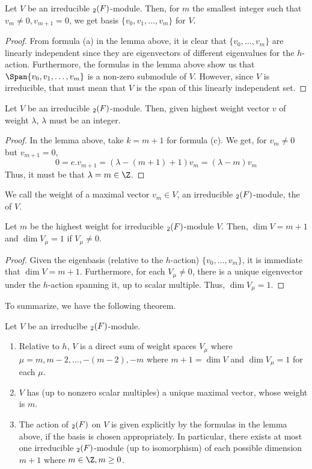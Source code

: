 \documentclass[11pt,leqno,oneside]{amsart}
\numberwithin{thm}{section}
\begin{document}
\begin{prop}
  Let \(V\) be an irreducible \(\sl_2(F)\)-module. Then, for \(m\) the
  smallest integer such that \(v_m \neq 0, v_{m+1} = 0\), we get basis
  \(\{v_0, v_1, \ldots, v_m\}\) for \(V\).
\end{prop}
\begin{proof}
  From formula (a) in the lemma above, it is clear that \(\{v_0,
  \ldots, v_m\}\) are linearly independent since they are eigenvectors
  of different eigenvalues for the \(h\)-action. Furthermore, the
  formulas in the lemma above show us that \(\Span \{v_0, v_1, \ldots,
  v_m\}\) is a non-zero submodule of \(V\). However, since \(V\) is
  irreducible, that must mean that \(V\) is the span of this linearly
  independent set. 
\end{proof}
\begin{prop}
  Let \(V\) be an irreducible \(\sl_2(F)\)-module. Then, given highest
  weight vector \(v\) of weight \(\lambda\), \(\lambda\) must be an
  integer. 
\end{prop}
\begin{proof}
  In the lemma above, take \(k = m+1\) for formula (c). We get, for
  \(v_m \neq 0\) but \(v_{m+1} = 0\), \[
    0 = e.v_{m+1} = (\lambda-(m+1)+1)v_m = (\lambda-m)v_m
  \]
  Thus, it must be that \(\lambda = m \in \Z\).
\end{proof}
\begin{defn}
  We call the weight of a maximal vector \(v_m \in V\), an irreducible
  \(\sl_2(F)\)-module, the  of \(V\).
\end{defn}
\begin{prop}\label{dim-of-hwt-mod}
  Let \(m\) be the highest weight for irreducible \(\sl_2(F)\)-module
  \(V\). Then, \(\dim V = m+1\) and \(\dim V_\mu = 1\) if \(V_\mu \neq
  0\).
\end{prop}
\begin{proof}
  Given the eigenbasis (relative to the \(h\)-action) \(\{v_0, \ldots,
  v_m\}\), it is immediate that \(\dim V = m+1\). Furthermore, for
  each \(V_\mu \neq 0\), there is a unique eigenvector under the
  \(h\)-action spanning it, up 
  to scalar multiple. Thus,
  \(\dim V_\mu = 1\). 
\end{proof}
To summarize, we have the following theorem.
\begin{thm}\label{sl2-summary}
  Let \(V\) be an irreduclbe \(\sl_2(F)\)-module.
  \begin{enumerate}
  \item Relative to \(h\), \(V\) is a direct sum of weight spaces
    \(V_\mu\) where \(\mu = m, m-2, \ldots, -(m-2), -m\) where \(m+1 =
    \dim V\) and \(\dim V_\mu = 1\) for each \(\mu\).
  \item \(V\) has (up to nonzero scalar multiples) a unique maximal
    vector, whose weight is \(m\).
  \item The action of \(\sl_2(F)\) on \(V\) is given explicitly by the
    formulas in the lemma above, if the basis is chosen
    appropriately. In particular, there exists at most one irreducible
    \(\sl_2(F)\)-module (up to isomorphism) of each possible dimension
    \(m+1\) where \(m \in \Z, m \geq 0\).
  \end{enumerate}
\end{thm}
\end{document}
